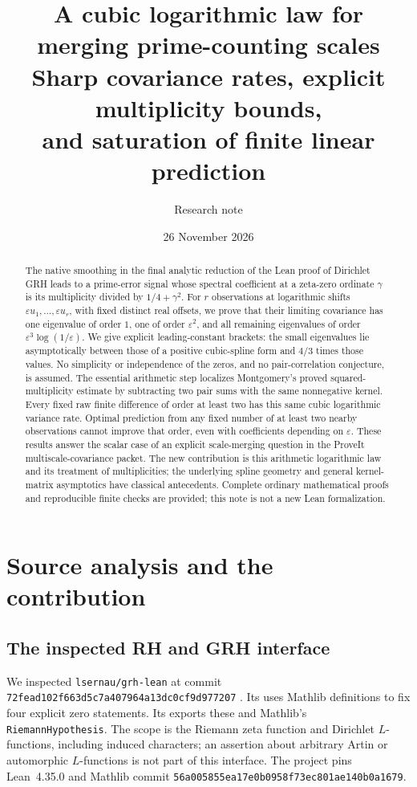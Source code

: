 \documentclass[11pt]{article}
\title{\textcolor{ink}{A cubic logarithmic law for\\merging prime-counting scales}\\[5pt]
\large Sharp covariance rates, explicit multiplicity bounds,\\and saturation of finite linear prediction}
\author{Research note}
\date{26 November 2026}
\theoremstyle{definition}\newtheorem{definition}[theorem]{Definition}
\theoremstyle{remark}\newtheorem{remark}[theorem]{Remark}
\newcommand{\eps}{\varepsilon}
\begin{document}
\maketitle
\begin{abstract}
The native smoothing in the final analytic reduction of the Lean proof of
Dirichlet GRH leads to a prime-error signal whose spectral coefficient at a
zeta-zero ordinate $\gamma$ is its multiplicity divided by $1/4+\gamma^2$.
For $r$ observations at logarithmic shifts $\eps u_1,\ldots,\eps u_r$, with
fixed distinct real offsets, we prove that their limiting covariance has
one eigenvalue of order $1$, one of order $\eps^2$, and all remaining
eigenvalues of order $\eps^3\log(1/\eps)$. We give explicit leading-constant
brackets: the small eigenvalues lie asymptotically between those of a
positive cubic-spline form and $4/3$ times those values. No simplicity or
independence of the zeros, and no pair-correlation conjecture, is assumed.
The essential arithmetic step localizes Montgomery's proved
squared-multiplicity estimate by subtracting two pair sums with the same
nonnegative kernel. Every fixed raw finite difference of order at least
two has this same cubic logarithmic variance rate. Optimal prediction
from any fixed number of at least two nearby observations cannot improve
that order, even with coefficients depending on $\eps$. These results
answer the scalar case of an explicit scale-merging question in the
ProveIt multiscale-covariance packet. The new contribution is this
arithmetic logarithmic law and its treatment of multiplicities; the
underlying spline geometry and general kernel-matrix asymptotics have
classical antecedents. Complete ordinary mathematical proofs and
reproducible finite checks are provided; this note is not a new Lean
formalization.
\end{abstract}
\begingroup
\small
\setcounter{tocdepth}{1}
\makeatletter
\renewcommand{\l@section}{\@dottedtocline{1}{0em}{1.7em}}
\makeatother
\tableofcontents
\endgroup
\newpage

\section{Source analysis and the contribution}
\subsection{The inspected RH and GRH interface}
We inspected \texttt{lsernau/grh-lean} at commit
\texttt{72fead102f663d5c7a407964a13dc0cf9d977207} \cite{grh}.
Its  uses Mathlib definitions to fix four
explicit zero statements. Its  exports these and
Mathlib's \texttt{RiemannHypothesis}. The scope is the Riemann zeta function
and Dirichlet $L$-functions, including induced characters; an assertion
about arbitrary Artin or automorphic $L$-functions is not part of this
interface. The project pins Lean~4.35.0 and Mathlib commit
\texttt{56a005855ea17e0b0958f73ec801ae140b0a1679}.
\end{document}
